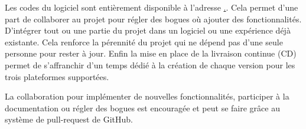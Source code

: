 	
	Les codes du logiciel sont entièrement disponible à l'adresse \url{.}. Cela permet d'une part de collaborer au projet pour régler des bogues où ajouter des fonctionnalités. D'intégrer tout ou une partie du projet dans un logiciel ou une expérience déjà existante. Cela renforce la pérennité du projet qui ne dépend pas d'une seule personne pour rester à jour. Enfin la mise en place de la livraison continue (CD) permet de s'affranchir d'un temps dédié à la création de chaque version pour les trois plateformes supportées.

	
	La collaboration pour implémenter de nouvelles fonctionnalités, participer à la documentation ou régler des bogues est encouragée et peut se faire grâce au système de pull-request de GitHub.
	
	

